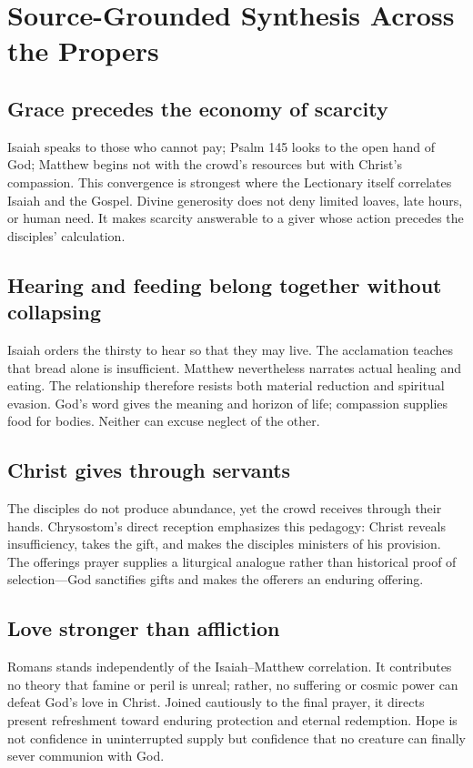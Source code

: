 \section*{Source-Grounded Synthesis Across the Propers}

\subsection*{Grace precedes the economy of scarcity}
Isaiah speaks to those who cannot pay; Psalm 145 looks to the open hand of God; Matthew begins not with the crowd's resources but with Christ's compassion. This convergence is strongest where the Lectionary itself correlates Isaiah and the Gospel. Divine generosity does not deny limited loaves, late hours, or human need. It makes scarcity answerable to a giver whose action precedes the disciples' calculation.

\subsection*{Hearing and feeding belong together without collapsing}
Isaiah orders the thirsty to hear so that they may live. The acclamation teaches that bread alone is insufficient. Matthew nevertheless narrates actual healing and eating. The relationship therefore resists both material reduction and spiritual evasion. God's word gives the meaning and horizon of life; compassion supplies food for bodies. Neither can excuse neglect of the other.

\subsection*{Christ gives through servants}
The disciples do not produce abundance, yet the crowd receives through their hands. Chrysostom's direct reception emphasizes this pedagogy: Christ reveals insufficiency, takes the gift, and makes the disciples ministers of his provision. The offerings prayer supplies a liturgical analogue rather than historical proof of selection—God sanctifies gifts and makes the offerers an enduring offering.

\subsection*{Love stronger than affliction}
Romans stands independently of the Isaiah--Matthew correlation. It contributes no theory that famine or peril is unreal; rather, no suffering or cosmic power can defeat God's love in Christ. Joined cautiously to the final prayer, it directs present refreshment toward enduring protection and eternal redemption. Hope is not confidence in uninterrupted supply but confidence that no creature can finally sever communion with God.

